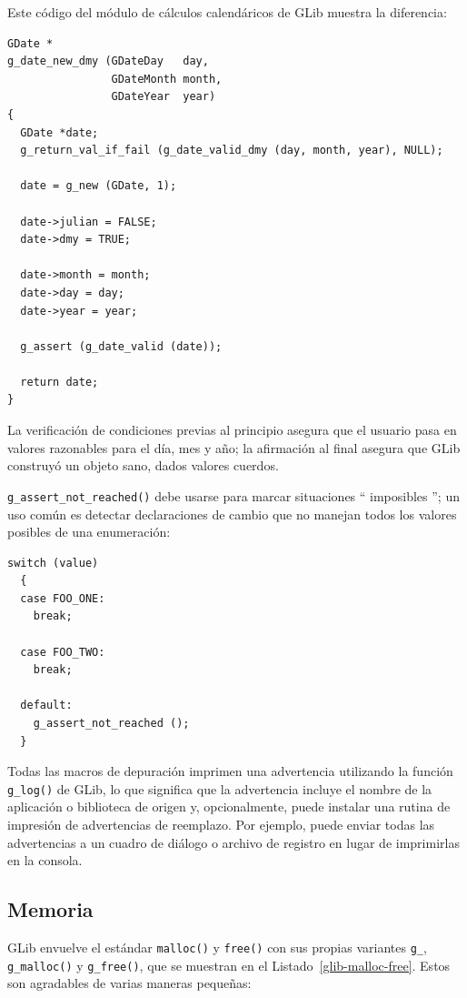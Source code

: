 Este código del módulo de cálculos calendáricos de GLib muestra la diferencia:
\begin{lstlisting}
GDate *
g_date_new_dmy (GDateDay   day,
                GDateMonth month,
                GDateYear  year)
{
  GDate *date;
  g_return_val_if_fail (g_date_valid_dmy (day, month, year), NULL);

  date = g_new (GDate, 1);

  date->julian = FALSE;
  date->dmy = TRUE;

  date->month = month;
  date->day = day;
  date->year = year;

  g_assert (g_date_valid (date));

  return date;
}
\end{lstlisting}

La verificación de condiciones previas al principio asegura que el usuario pasa en valores razonables para el día, mes y año; la afirmación al final asegura que GLib construyó un objeto sano, dados valores cuerdos.

\lstinline{g_assert_not_reached()} debe usarse para marcar situaciones `` imposibles ''; un uso común es detectar declaraciones de cambio que no manejan todos los valores posibles de una enumeración:
\begin{lstlisting}
switch (value)
  {
  case FOO_ONE:
    break;

  case FOO_TWO:
    break;

  default:
    g_assert_not_reached ();
  }
\end{lstlisting}

Todas las macros de depuración imprimen una advertencia utilizando la función \lstinline{g_log()} de GLib, lo que significa que la advertencia incluye el nombre de la aplicación o biblioteca de origen y, opcionalmente, puede instalar una rutina de impresión de advertencias de reemplazo. Por ejemplo, puede enviar todas las advertencias a un cuadro de diálogo o archivo de registro en lugar de imprimirlas en la consola.

\subsection{Memoria}

GLib envuelve el estándar \lstinline{malloc()} y \lstinline{free()} con sus propias variantes \lstinline{g_}, \lstinline{g_malloc()} y \lstinline{g_free()}, que se muestran en el Listado~\ref{glib-malloc-free}.
Estos son agradables de varias maneras pequeñas:

